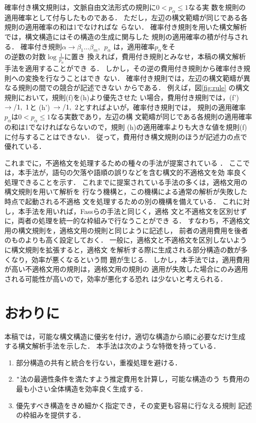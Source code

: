 確率付き構文規則は，文脈自由文法形式の規則に$0 < p_\alpha \le 1$なる実
数を規則の適用確率として付与したものである．
ただし，左辺の構文範疇が同じである各規則の適用確率の和は1でなければな
らない．
確率付き規則を用いた構文解析では，構文構造にはその構造の生成に関与した
規則の適用確率の積が付与される．
確率付き規則$\alpha \rightarrow \beta_1 \ldots \beta_m,\ \ p_\alpha$
は，適用確率$p_\alpha$をそ\\の逆数の対数$\log \frac{1}{p_\alpha}$に置き
換えれば，費用付き規則とみなせ，本稿の構文解析手法を適用することができ
る．
しかし，その逆の費用付き規則から確率付き規則への変換を行なうことはでき
ない．
確率付き規則では，左辺の構文範疇が異なる規則の間での競合が記述できない
からである．
例えば，図\ref{fig:rule} の構文規則において，規則(f)を(h)より優先させた
い場合，費用付き規則では，(f')~$ \rightarrow /1,\ 1$と
(h')~$ \rightarrow /1,\ 2$とすればよいが，確率付き規則では，
規則の適用確率$p_\alpha$は$0 < p_\alpha \le 1$なる実数であり，左辺の構
文範疇が同じである各規則の適用確率の和は1でなければならないので，規則
(h)の適用確率よりも大きな値を規則(f)に付与することはできない．
従って，費用付き構文規則のほうが記述力の点で優れている．

これまでに，不適格文を処理するための種々の手法が提案されている
\cite{Matsumoto94}．
ここでは，本手法が，語句の欠落や語順の誤りなどを含む構文的不適格文を効
率良く処理できることを示す．
これまでに提案されている手法の多くは，適格文用の構文規則を用いて解析を
行なう機構と，この機構による通常の解析が失敗した時点で起動される不適格
文を処理するための別の機構を備えている．
これに対し，本手法を用いれば，Fassらの手法\cite{Fass83}と同じく，適格
文と不適格文を区別せずに，両者の処理を統一的な枠組みで行なうことができ
る．
すなわち，不適格文用の構文規則を，適格文用の規則と同じように記述し，
前者の適用費用を後者のものよりも高く設定しておく．
一般に，適格文と不適格文を区別しないように構文規則を拡張すると，適格文
を解析する際に生成される部分構造の数が多くなり，効率が悪くなるという問
題が生じる．
しかし，本手法では，適用費用が高い不適格文用の規則は，適格文用の規則の
適用が失敗した場合にのみ適用される可能性が高いので，効率が悪化する恐れ
は少ないと考えられる．

\section{おわりに}

本稿では，可能な構文構造に優劣を付け，適切な構造から順に必要なだけ生成
する構文解析手法を示した．
本手法は次のような特徴を持っている．
\begin{enumerate}
\item 部分構造の共有と統合を行ない，重複処理を避ける．
\item $^*$法の最適性条件を満たすよう推定費用を計算し，可能な構造のう
ち費用の最も小さい全体構造を効率良く生成する．
\item 優先すべき構造をきめ細かく指定でき，その変更も容易に行なえる規則
記述の枠組みを提供する．
\end{enumerate}

